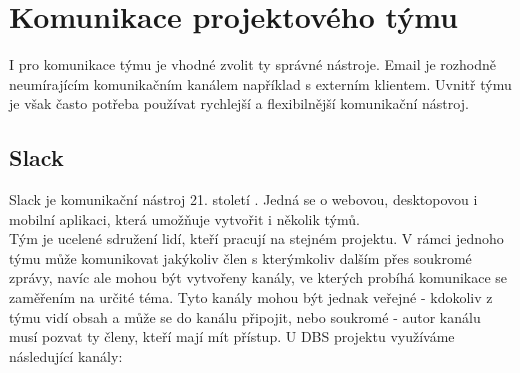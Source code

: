 \section{Komunikace projektového týmu}

I pro komunikace týmu je vhodné zvolit ty správné nástroje. Email je rozhodně neumírajícím komunikačním kanálem například s externím klientem. Uvnitř týmu je však často potřeba používat rychlejší a flexibilnější komunikační nástroj.

\subsection{Slack} \label{slack}

Slack je komunikační nástroj 21. století \cite{slack}. Jedná se o webovou, desktopovou i mobilní aplikaci, která umožňuje vytvořit i několik týmů.\\
Tým je ucelené sdružení lidí, kteří pracují na stejném projektu. V rámci jednoho týmu může komunikovat jakýkoliv člen s kterýmkoliv dalším přes soukromé zprávy, navíc ale mohou být vytvořeny kanály, ve kterých probíhá komunikace se zaměřením na určité téma. Tyto kanály mohou být jednak veřejné - kdokoliv z týmu vidí obsah a může se do kanálu připojit, nebo soukromé - autor kanálu musí pozvat ty členy, kteří mají mít přístup. U DBS projektu využíváme následující kanály:
